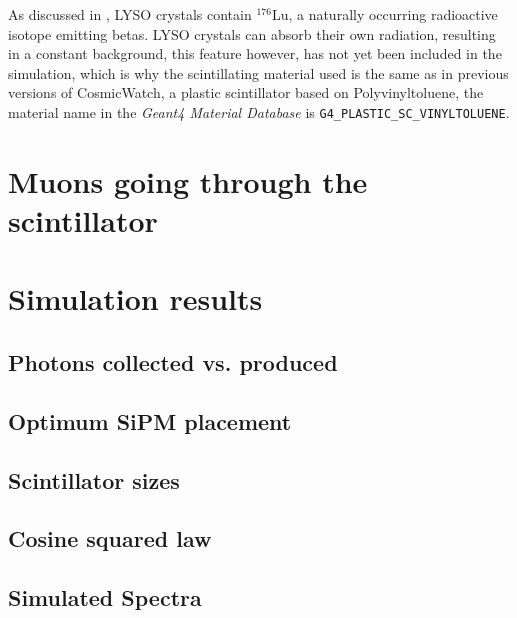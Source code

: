 
As discussed in , LYSO crystals contain $^{176}$Lu, a naturally occurring radioactive isotope emitting betas. LYSO crystals can absorb their own radiation, resulting in a constant background, this feature however, has not yet been included in the simulation, which is why the scintillating material used is the same as in previous versions of CosmicWatch, a plastic scintillator based on Polyvinyltoluene, the material name in the \textit{Geant4 Material Database} is \texttt{G4\_PLASTIC\_SC\_VINYLTOLUENE}.

\section{Muons going through the scintillator}

\section{Simulation results}

\subsection{Photons collected vs. produced}\label{sec:collected_produced}

\subsection{Optimum SiPM placement}\label{sec:SiPM_placement}

\subsection{Scintillator sizes}\label{sec:Scint_size}

\subsection{Cosine squared law}\label{sec:cos_squared}

\subsection{Simulated Spectra}